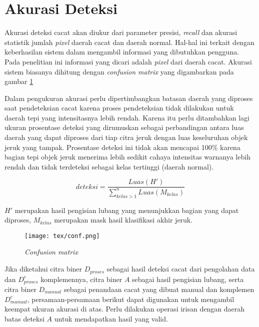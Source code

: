 \documentclass[laporan.tex]{subfiles}
\begin{document}
\section{Akurasi Deteksi}

Akurasi deteksi cacat akan diukur dari parameter presisi, \emph{recall} dan akurasi statistik jumlah \emph{pixel} daerah cacat dan daerah normal. Hal-hal ini terkait dengan keberhasilan sistem dalam mengambil informasi yang dibutuhkan pengguna. Pada penelitian ini informasi yang dicari adalah \emph{pixel} dari daerah cacat. Akurasi sistem biasanya dihitung dengan \emph{confusion matrix} yang digambarkan pada gambar \ref{fig:confmatrix2}

Dalam pengukuran akurasi perlu dipertimbangkan batasan daerah yang diproses saat pendeteksian cacat karena proses pendeteksian tidak dilakukan untuk daerah tepi yang intensitasnya lebih rendah. Karena itu perlu ditambahkan lagi ukuran prosentase deteksi yang dirumuskan sebagai perbandingan antara luas daerah yang dapat diproses dari tiap citra jeruk dengan luas keseluruhan objek jeruk yang tampak. Prosentase deteksi ini tidak akan mencapai 100\% karena bagian tepi objek jeruk menerima lebih sedikit cahaya intensitas warnanya lebih rendah dan tidak terdeteksi sebagai kelas tertinggi (daerah normal).

\begin{equation}
	deteksi = \frac{Luas(H')}{\sum_{kelas>1}^n Luas(M_{kelas})}
\end{equation}

$H'$ merupakan hasil pengisian lubang yang menunjukkan bagian yang dapat diproses, $M_{kelas}$ merupakan mask hasil klasifikasi akhir jeruk.

\begin{figure}[h]
\centering
\texttt{[image: tex/conf.png]}
\caption{\emph{Confusion matrix}}
\label{fig:confmatrix2}
\end{figure}

Jika diketahui citra biner $D_{proses}$ sebagai hasil deteksi cacat dari pengolahan data dan $D_{proses}^c$ komplemennya, citra biner $A$ sebagai hasil pengisian lubang, serta citra biner $D_{manual}$ sebagai penandaan cacat yang dibuat manual dan komplemen $D_{manual}^c$, persamaan-persamaan berikut dapat digunakan untuk mengambil keempat ukuran akurasi di atas. Perlu dilakukan operasi irisan dengan daerah batas deteksi $A$ untuk mendapatkan hasil yang valid.
\end{document}
